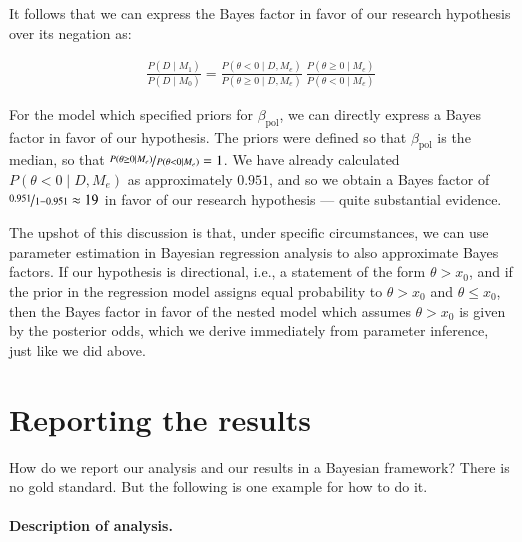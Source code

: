 \documentclass[nobib]{tufte-handout}
\begin{document}
It follows that we can express the Bayes factor in favor of our research hypothesis over its
negation as:

\begin{align*}
   \frac{P(D \mid M_1)}{P(D \mid M_0)} =  \frac{P(\theta < 0 \mid D, M_e)}{P(\theta \geq 0 \mid D, M_e)} \ \frac{P(\theta \geq 0 \mid M_e)}{P(\theta < 0 \mid M_e)}
\end{align*}

For the model which specified priors for $\beta_{\text{pol}}$, we can directly express a Bayes
factor in favor of our hypothesis. The priors were defined so that $\beta_{\text{pol}}$ is the
median, so that $ \nicefrac{P(\theta \geq 0 \mid M_e)}{P(\theta < 0 \mid M_e)} = 1$. We have
already calculated $P(\theta < 0 \mid D, M_e)$ as approximately $0.951$, and so we obtain a
Bayes factor of $\nicefrac{0.951}{1-0.951} \approx 19$ in favor of our research hypothesis ---
quite substantial evidence.

The upshot of this discussion is that, under specific circumstances, we can use parameter
estimation in Bayesian regression analysis to also approximate Bayes factors. If our hypothesis
is directional, i.e., a statement of the form $\theta > x_0$, and if the prior in the
regression model assigns equal probability to $\theta > x_0$ and $\theta \leq x_0$, then the
Bayes factor in favor of the nested model which assumes $\theta > x_0$ is given by the posterior
odds, which we derive immediately from parameter inference, just like we did above.




\section{Reporting the results}
How do we report our analysis and our results in a Bayesian framework? There is no gold
standard. But the following is one example for how to do it.

\paragraph{Description of analysis.}
\end{document}
